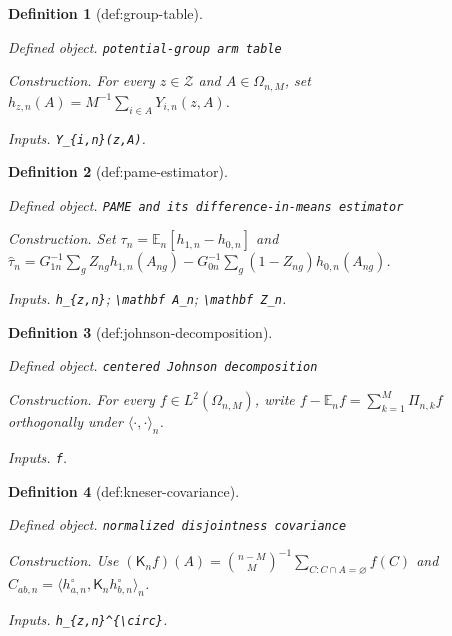\documentclass{article}
\newtheorem{definition}{Definition}
\begin{document}
\begin{definition}[def:group-table]\label{def:group-table}
\par\smallskip\noindent\emph{Defined object.} \texttt{potential-\allowbreak{}group arm table}
\par\smallskip\noindent\emph{Construction.} For every \(z\in\mathcal Z\) and \(A\in\Omega_{n,M}\), set \(h_{z,n}(A)=M^{-1}\sum_{i\in A}Y_{i,n}(z,A)\).
\par\smallskip\noindent\emph{Inputs.} \texttt{Y\_\allowbreak{}\{i,\allowbreak{}n\}\allowbreak{}(z,\allowbreak{}A)}.
\end{definition}

\begin{definition}[def:pame-estimator]\label{def:pame-estimator}
\par\smallskip\noindent\emph{Defined object.} \texttt{PAME and its difference-\allowbreak{}in-\allowbreak{}means estimator}
\par\smallskip\noindent\emph{Construction.} Set \(\tau_n=\mathbb E_n[h_{1,n}-h_{0,n}]\) and \(\widehat\tau_n=G_{1n}^{-1}\sum_gZ_{ng}h_{1,n}(A_{ng})-G_{0n}^{-1}\sum_g(1-Z_{ng})h_{0,n}(A_{ng})\).
\par\smallskip\noindent\emph{Inputs.} \texttt{h\_\allowbreak{}\{z,\allowbreak{}n\}\allowbreak{}}; \texttt{\textbackslash{}\allowbreak{}mathbf A\_\allowbreak{}n}; \texttt{\textbackslash{}\allowbreak{}mathbf Z\_\allowbreak{}n}.
\end{definition}

\begin{definition}[def:johnson-decomposition]\label{def:johnson-decomposition}
\par\smallskip\noindent\emph{Defined object.} \texttt{centered Johnson decomposition}
\par\smallskip\noindent\emph{Construction.} For every \(f\in L^2(\Omega_{n,M})\), write \(f-\mathbb E_nf=\sum_{k=1}^M\Pi_{n,k}f\) orthogonally under \(\langle\cdot,\cdot\rangle_n\).
\par\smallskip\noindent\emph{Inputs.} \texttt{f}.
\end{definition}

\begin{definition}[def:kneser-covariance]\label{def:kneser-covariance}
\par\smallskip\noindent\emph{Defined object.} \texttt{normalized disjointness covariance}
\par\smallskip\noindent\emph{Construction.} Use \((\mathsf K_nf)(A)=\binom{n-M}{M}^{-1}\sum_{C:C\cap A=\varnothing}f(C)\) and \(C_{ab,n}=\langle h_{a,n}^{\circ},\mathsf K_nh_{b,n}^{\circ}\rangle_n\).
\par\smallskip\noindent\emph{Inputs.} \texttt{h\_\allowbreak{}\{z,\allowbreak{}n\}\allowbreak{}\textasciicircum{}\{\textbackslash{}\allowbreak{}circ\}\allowbreak{}}.
\end{definition}
\end{document}
